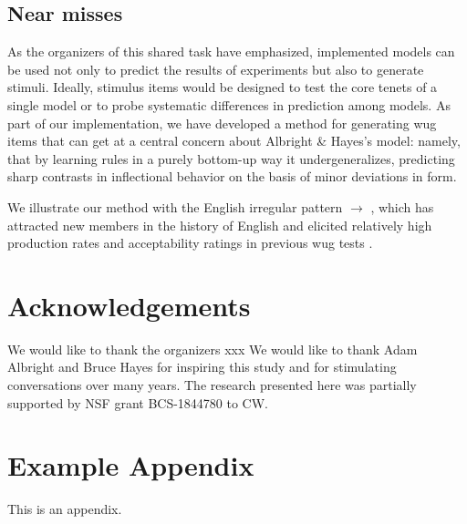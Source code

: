 \documentclass[11pt]{article}
\begin{document}
\subsection{Near misses}

As the organizers of this shared task have emphasized, implemented models can be used not only to predict the results of experiments but also to generate stimuli. Ideally, stimulus items would be designed to test the core tenets of a single model or to probe systematic differences in prediction among models. As part of our implementation, we have developed a method for generating wug items that can get at a central concern about Albright \& Hayes's model: namely, that by learning rules in a purely bottom-up way it undergeneralizes, predicting sharp contrasts in inflectional behavior on the basis of minor deviations in form.

We illustrate our method with the English irregular pattern  $\to$ , which has attracted new members in the history of English and elicited relatively high production rates and acceptability ratings in previous wug tests \citep[\emph{e.g.},][]{bybee1983}.



\citep{tenenbaum1999} %

\citep{plotkin1970} %

\citep{mohri-sproat-1996-efficient}

\citep{riley-etal-2009-openfst}


\section*{Acknowledgements}

We would like to thank the organizers xxx We would like to thank Adam Albright and Bruce Hayes for inspiring this study and for stimulating conversations over many years. The research presented here was partially supported by NSF grant BCS-1844780 to CW.






\appendix

\section{Example Appendix}
\label{sec:appendix}

This is an appendix.
\end{document}
